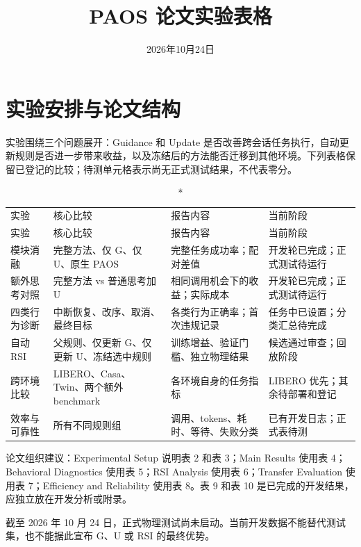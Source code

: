 \documentclass[UTF8,10pt,a4paper]{ctexart}
\begin{document}
\title{PAOS 论文实验表格}\date{2026年10月24日}\maketitle
\section*{实验安排与论文结构}
实验围绕三个问题展开：Guidance 和 Update 是否改善跨会话任务执行，自动更新规则是否进一步带来收益，以及冻结后的方法能否迁移到其他环境。下列表格保留已登记的比较；待测单元格表示尚无正式测试结果，不代表零分。
\begin{small}
\begin{longtable}{>{\raggedright\arraybackslash}p{2.36cm}>{\raggedright\arraybackslash}p{4.62cm}>{\raggedright\arraybackslash}p{4.17cm}>{\raggedright\arraybackslash}p{4.39cm}}
\caption*{表 1 实验问题与证据安排}\\
\toprule
实验 & 核心比较 & 报告内容 & 当前阶段\\\midrule
\endfirsthead
\toprule
实验 & 核心比较 & 报告内容 & 当前阶段\\\midrule
\endhead
模块消融 & 完整方法、仅 G、仅 U、原生 PAOS & 完整任务成功率；配对差值 & 开发轮已完成；正式测试待运行\\
额外思考对照 & 完整方法 vs 普通思考加 U & 相同调用机会下的收益；实际成本 & 开发轮已完成；正式测试待运行\\
四类行为诊断 & 中断恢复、改序、取消、最终目标 & 各类行为正确率；首次违规记录 & 任务中已设置；分类汇总待完成\\
自动 RSI & 父规则、仅更新 G、仅更新 U、冻结选中规则 & 训练增益、验证门槛、独立物理结果 & 候选通过审查；回放阶段\\
跨环境比较 & LIBERO、Casa、Twin、两个额外 benchmark & 各环境自身的任务指标 & LIBERO 优先；其余待部署和登记\\
效率与可靠性 & 所有不同规则组 & 调用、tokens、耗时、等待、失败分类 & 已有开发日志；正式表待测\\
\bottomrule
\end{longtable}
\end{small}
论文组织建议：Experimental Setup 说明表 2 和表 3；Main Results 使用表 4；Behavioral Diagnostics 使用表 5；RSI Analysis 使用表 6；Transfer Evaluation 使用表 7；Efficiency and Reliability 使用表 8。表 9 和表 10 是已完成的开发结果，应独立放在开发分析或附录。

截至 2026 年 10 月 24 日，正式物理测试尚未启动。当前开发数据不能替代测试集，也不能据此宣布 G、U 或 RSI 的最终优势。
\end{document}
